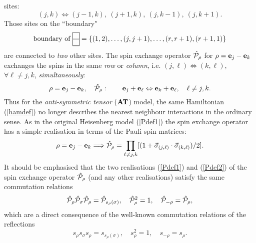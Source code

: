 \documentclass[a4paper,12pt]{article}
\def\twosqr#1#2{{\vcenter{\hrule height.#2pt
      \hbox{\vrule width.#2pt height#1pt \kern#1pt
          \vrule width.#2pt}
      \hrule height.#2pt
      \hbox{\vrule width.#2pt height#1pt \kern#1pt
          \vrule width.#2pt}
      \hrule height.#2pt}}}
\begin{document}
sites:
\begin{equation}
(j,k) \Longleftrightarrow (j-1,k),\ (j+1,k),\ (j,k-1),\ (j,k+1).
\end{equation}
Those sites on the ``boundary"
\begin{equation}
\mbox{boundary of}\ {\twosqr{9}5}=
\{(1,2),\ldots,(j,j+1),\ldots,(r,r+1),(r+1,1)\}
\end{equation}
are connected to {\em two\/} other sites.
The spin exchange operator $\hat{\cal P}_\rho$ for
$\rho={\bf e}_j-{\bf e}_k$ exchanges the spins in
the same {\em row\/} or {\em
column\/}, i.e.
$(j,\ell)\Leftrightarrow (k,\ell)$, $\forall\ell\neq j,k$, {\em
simultaneously\/}:
\begin{equation}
\rho={\bf e}_j-{\bf e}_k,\quad \hat{\cal P}_\rho:\qquad
{\bf e}_j+{\bf e}_\ell\Leftrightarrow
{\bf e}_k+{\bf e}_\ell,\quad \ell\neq j,k.
\end{equation}
Thus for the {\em anti-symmetric tensor\/} (${\bf AT}$) model, the
same Hamiltonian (\ref{hamdef}) no longer describes the nearest neighbour
interactions in the ordinary sense. As in the original Heisenberg model
(\ref{Pdef1})  the spin exchange operator has a
simple realisation in terms of the
Pauli spin matrices:
\begin{equation}
\rho={\bf e}_j-{\bf e}_k\Longrightarrow
\hat{\cal P}_\rho=\prod_{\ell\neq
j,k}[(1+\vec{\sigma}_{(j,\ell)}\cdot\vec{\sigma}_{(k,\ell)})/2].
\label{Pdef2}
\end{equation}
It should be emphasised that the two realisations
(\ref{Pdef1}) and (\ref{Pdef2}) of
the  spin exchange operator $\hat{\cal P}_\rho$ (and any other realisations)
satisfy the same commutation relations
\begin{equation}
  \hat{\cal P}_{\rho}\hat{\cal P}_{\sigma}\hat{\cal P}_{\rho}
   =\hat{\cal P}_{s_{\rho}(\sigma)},\quad
\hat{\cal P}_{\rho}^2=1,\quad \hat{\cal P}_{-\rho}=\hat{\cal
P}_{\rho},
\label{pcom}
\end{equation}
which are a direct consequence of the well-known commutation relations of
the
reflections
\begin{equation}
{s}_{\rho}{s}_{\sigma}{s}_{\rho}
   ={s}_{s_{\rho}(\sigma)},\quad
{s}_{\rho}^2=1,\quad {s}_{-\rho}={s}_{\rho}.
\end{equation}
\end{document}
